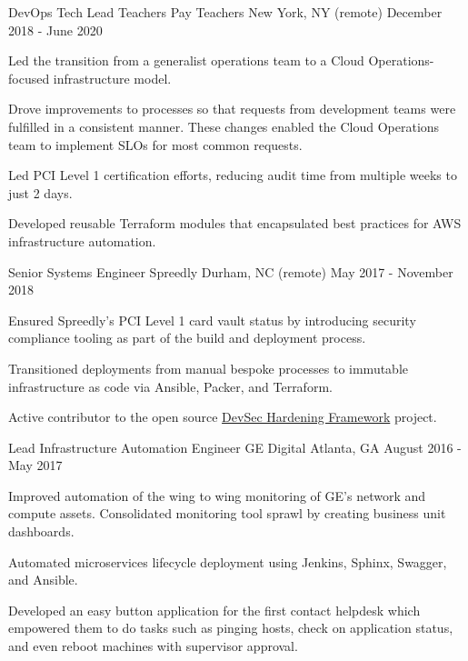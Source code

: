 \begin{cventries}
  \cventry
    {DevOps Tech Lead} %
    {Teachers Pay Teachers} %
    {New York, NY (remote)} %
    {December 2018 - June 2020} %
    {
      \begin{cvitems} %
        \item {Led the transition from a generalist operations team to a Cloud Operations-focused infrastructure model.}
        \item {Drove improvements to processes so that requests from development teams were fulfilled in a consistent manner. These changes enabled the Cloud Operations team to implement SLOs for most common requests.}
        \item {Led PCI Level 1 certification efforts, reducing audit time from multiple weeks to just 2 days.}
        \item {Developed reusable Terraform modules that encapsulated best practices for AWS infrastructure automation.}
      \end{cvitems}
    }

  \cventry
    {Senior Systems Engineer} %
    {Spreedly} %
    {Durham, NC (remote)} %
    {May 2017 - November 2018} %
    {
      \begin{cvitems}
        \item {Ensured Spreedly's PCI Level 1 card vault status by introducing security compliance tooling as part of the build and deployment process.}
        \item {Transitioned deployments from manual bespoke processes to immutable infrastructure as code via Ansible, Packer, and Terraform.}
        \item {Active contributor to the open source \href{https://github.com/dev-sec}{DevSec Hardening Framework} project.}
      \end{cvitems}
    }

  \cventry
    {Lead Infrastructure Automation Engineer} %
    {GE Digital} %
    {Atlanta, GA} %
    {August 2016 - May 2017} %
    {
      \begin{cvitems}
        \item {Improved automation of the wing to wing monitoring of GE's network and compute assets. Consolidated monitoring tool sprawl by creating business unit dashboards.}
        \item {Automated microservices lifecycle deployment using Jenkins, Sphinx, Swagger, and Ansible.}
        \item {Developed an easy button application for the first contact helpdesk which empowered them to do tasks such as pinging hosts, check on application status, and even reboot machines with supervisor approval.}
      \end{cvitems}
    }


\end{cventries}
